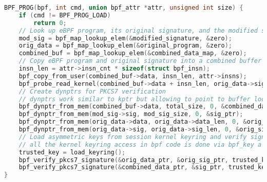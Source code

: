 \documentclass [11pt, proquest] {uwthesis}[2020/02/24]
\begin{document}
{\small 
\begin{lstlisting}[language=C, caption={Kernel BPF LSM Hook for PKCS7 Signature Verification}, label={lst:bpf-lsm}]
BPF_PROG(bpf, int cmd, union bpf_attr *attr, unsigned int size) {
    if (cmd != BPF_PROG_LOAD)
        return 0;
    // Look up eBPF program, its original signature, and the modified signature
    mod_sig = bpf_map_lookup_elem(&modified_signature, &zero);
    orig_data = bpf_map_lookup_elem(&original_program, &zero);
    combined_buf = bpf_map_lookup_elem(&combined_data_map, &zero);
    // Copy eBPF program and original signature into a combined buffer
    insn_len = attr->insn_cnt * sizeof(struct bpf_insn);
    bpf_copy_from_user(combined_buf->data, insn_len, attr->insns);
    bpf_probe_read_kernel(combined_buf->data + insn_len, orig_data->sig_len, orig_data->sig);
    // Create dynptrs for PKCS7 verification
    // dynptrs work similar to kptr but allowing to point to buffer location storing large amount of data as in case of eBPF signed paylods to satisfy eBPF verifier requirements. 
    bpf_dynptr_from_mem(combined_buf->data, total_size, 0, &combined_data_ptr);
    bpf_dynptr_from_mem(mod_sig->sig, mod_sig_size, 0, &sig_ptr);
    bpf_dynptr_from_mem(orig_data->data, orig_data->data_len, 0, &orig_data_ptr);
    bpf_dynptr_from_mem(orig_data->sig, orig_data->sig_len, 0, &orig_sig_ptr);
    // Load asymmetric keys from session kernel keyring and verify signatures
    // all the kernel keyring access in bpf code is done via bpf_key a wrapper over kernel core key structure
    trusted_key = load_keyring();
    bpf_verify_pkcs7_signature(&orig_data_ptr, &orig_sig_ptr, trusted_key);
    bpf_verify_pkcs7_signature(&combined_data_ptr, &sig_ptr, trusted_key);
}
\end{lstlisting}
}
\end{document}
